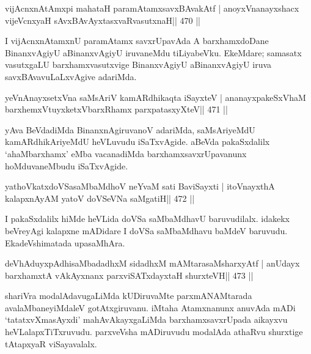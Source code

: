 
\begin{shl}
vijAcnxnAtAmx\s pi mahataH paramAtamxsavxBAvakAtf |
anoyxV\s nanayxshacx vijeVcnxyaH sAvxBAvAyxtasxvaRvasutxnaH\hfill || 470 ||
\end{shl}

\begin{artha}
I vijAcnxnAtamxnU paramAtamx savxrUpavAda A barxhamxdoDane BinanxvAgiyU aBinanxvAgiyU iruvaneMdu tiLiyabeVku. EkeMdare; samasatx vasutxgaLU barxhamxvasutxvige BinanxvAgiyU aBinanxvAgiyU iruva savxBAvavuLaLxvAgive adariMda.
\end{artha}




\begin{shl}
yeVnAnayxsetxVna saMsAriV kamARdhikaqta iSayxteV |
ananayxpakeSxV\s haM barxhemxVtuyxketxVbarxRhamx parxpatasxyXteV\hfill || 471 ||
\end{shl}

\begin{artha}
yAva BeVdadiMda BinanxnAgiruvanoV adariMda, saMsAriyeMdU kamARdhikAriyeMdU heVLuvudu iSaTxvAgide. aBeVda pakaSxdalilx `ahaMbarxhamx' eMba vacanadiMda barxhamxsavxrUpavanunx hoMduvaneMbudu iSaTxvAgide.
\end{artha}

\begin{shl}
yathoVkatxdoVSasaMbaMdhoV neYvaM sati BaviSayxti |
itoV\s nayxthA kalapxnAyAM yatoV doVSeVNa saMgatiH\hfill || 472 ||
\end{shl}

\begin{artha}
I pakaSxdalilx hiMde heVLida doVSa saMbaMdhavU baruvudilalx. idakekx beVreyAgi kalapxne mADidare I doVSa saMbaMdhavu baMdeV baruvudu. EkadeVshimatada upasaMhAra.
\end{artha}



\begin{shl}
deVhAduyxpAdhisaMbadadhxM sidadhxM mAMtarasaMsharxyAtf |
anUdayx barxhamxtA vAkAyxnanx parxviSATxdayxtaH shurxteVH\hfill || 473 ||
\end{shl}

\begin{artha}
shariVra modalAdavugaLiMda kUDiruvaMte parxmANAMtarada  avalaMbaneyiMdaleV gotAtxgiruvanu. iMtaha Atamxnanunx anuvAda mADi `tatatxvXmasAyxdi' mahAvAkayxgaLiMda barxhamxsavxrUpada aikayxvu heVLalapxTiTxruvudu. parxveVsha mADiruvudu modalAda athaRvu shurxtige tAtapxyaR viSayavalalx.
\end{artha}


